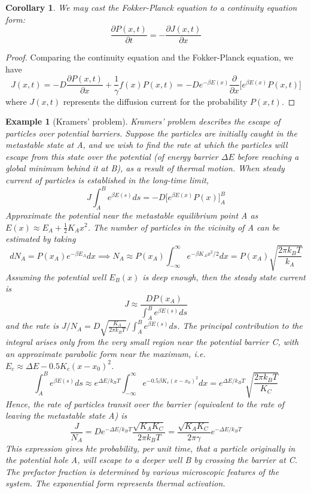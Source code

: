 \documentclass[a4paper]{article}
\newtheorem{eg}{Example}[section]
\theoremstyle{new}
\newtheorem{cor}{Corollary}[section]
\begin{document}
\begin{cor}
We may cast the Fokker-Planck equation to a continuity equation form:
$$\frac{\partial P(x,t)}{\partial t}=-\frac{\partial J(x,t)}{\partial x}$$
\end{cor}
\begin{proof}
Comparing the continuity equation and the Fokker-Planck equation, we have
$$J(x,t)=-D\frac{\partial P(x,t)}{\partial x}+\frac{1}{\gamma}f(x)P(x,t)=-De^{-\beta E(x)}\frac{\partial}{\partial x}\bigg[e^{\beta E(x)}P(x,t)\bigg]$$
where $J(x,t)$ represents the diffusion current for the probability $P(x,t)$.
\end{proof}
\begin{eg}[Kramers' problem]
Kramers' problem describes the escape of particles over potential barriers. Suppose the particles are initially caught in the metastable state at A, and we wish to find the rate at which the particles will escape from this state over the potential (of energy barrier $\Delta E$ before reaching a global minimum behind it at B), as a result of thermal motion. When steady current of particles is established in the long-time limit,
$$J\int_A^Be^{\beta E(s)}ds=-D\bigg[e^{\beta E(x)}P(x)\bigg]_A^B$$
Approximate the potential near the metastable equilibrium point A as $E(x)\approx E_A+\frac{1}{2}K_Ax^2$. The number of particles in the vicinity of A can be estimated by taking
$$dN_A=P(x_A)e^{-\beta E_A}dx\implies N_A\approx P(x_A)\int_{-\infty}^\infty e^{-\beta K_Ax^2/2}dx=P(x_A)\sqrt{\frac{2\pi k_BT}{k_A}}$$
Assuming the potential well $E_B(x)$ is deep enough, then the steady state current is
$$J\approx\frac{DP(x_A)}{\int_A^Be^{\beta E(s)}ds}$$
and the rate is $J/N_A=D\sqrt{\frac{K_A}{2\pi k_BT}}/\int_A^Be^{\beta E(s)}ds$. The principal contribution to the integral arises only from the very small region near the potential barrier C, with an approximate parabolic form near the maximum, i.e. $E_c\approx\Delta E-0.5K_c(x-x_0)^2$.
$$\int_A^Be^{\beta E(s)}ds\approx e^{\Delta E/k_BT}\int_{-\infty}^\infty e^{-0.5\beta K_c(x-x_0)^2}dx=e^{\Delta E/k_BT}\sqrt{\frac{2\pi k_BT}{K_C}}$$
Hence, the rate of particles transit over the barrier (equivalent to the rate of leaving the metastable state A) is
$$\frac{J}{N_A}=De^{-\Delta E/k_BT}\frac{\sqrt{K_AK_C}}{2\pi k_BT}=\frac{\sqrt{K_AK_C}}{2\pi\gamma}e^{-\Delta E/k_BT}$$
This expression gives hte probability, per unit time, that a particle originally in the potential hole A, will escape to a deeper well B by crossing the barrier at C. The prefactor fraction is determined by various microscopic features of the system. The exponential form represents thermal activation.
\end{eg}
\newpage
\end{document}
